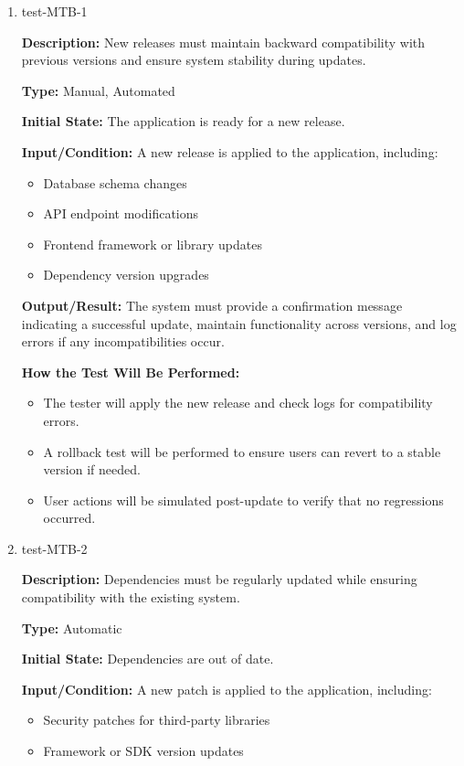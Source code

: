 \documentclass[12pt, titlepage]{article}
\begin{document}
\begin{enumerate}

\item{test-MTB-1\\}

\textbf{Description:} New releases must maintain backward compatibility with previous versions and ensure system stability during updates.

\textbf{Type:} Manual, Automated

\textbf{Initial State:} The application is ready for a new release.

\textbf{Input/Condition:} A new release is applied to the application, including:
\begin{itemize}
    \item Database schema changes
    \item API endpoint modifications
    \item Frontend framework or library updates
    \item Dependency version upgrades
\end{itemize}

\textbf{Output/Result:} The system must provide a confirmation message indicating a successful update, maintain functionality across versions, and log errors if any incompatibilities occur.

\textbf{How the Test Will Be Performed:} 
\begin{itemize}
    \item The tester will apply the new release and check logs for compatibility errors.
    \item A rollback test will be performed to ensure users can revert to a stable version if needed.
    \item User actions will be simulated post-update to verify that no regressions occurred.
\end{itemize}

\item{test-MTB-2\\}

\textbf{Description:} Dependencies must be regularly updated while ensuring compatibility with the existing system.

\textbf{Type:} Automatic

\textbf{Initial State:} Dependencies are out of date.

\textbf{Input/Condition:} A new patch is applied to the application, including:
\begin{itemize}
    \item Security patches for third-party libraries
    \item Framework or SDK version updates
\end{itemize}


\end{enumerate}
\end{document}
